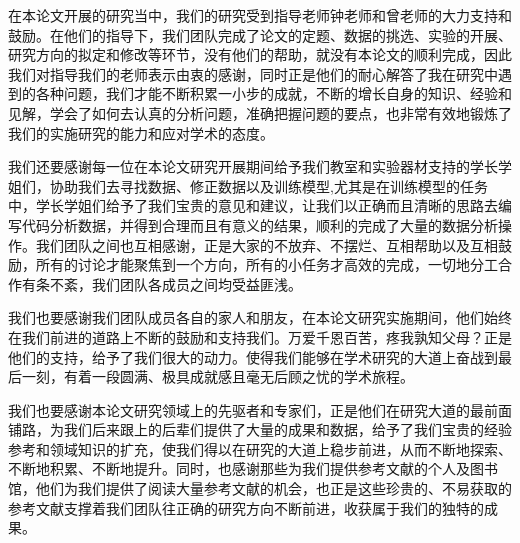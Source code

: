 
\makeacknowledgement

在本论文开展的研究当中，我们的研究受到指导老师钟老师和曾老师的大力支持和鼓励。在他们的指导下，我们团队完成了论文的定题、数据的挑选、实验的开展、研究方向的拟定和修改等环节，没有他们的帮助，就没有本论文的顺利完成，因此我们对指导我们的老师表示由衷的感谢，同时正是他们的耐心解答了我在研究中遇到的各种问题，我们才能不断积累一小步的成就，不断的增长自身的知识、经验和见解，学会了如何去认真的分析问题，准确把握问题的要点，也非常有效地锻炼了我们的实施研究的能力和应对学术的态度。

我们还要感谢每一位在本论文研究开展期间给予我们教室和实验器材支持的学长学姐们，协助我们去寻找数据、修正数据以及训练模型,尤其是在训练模型的任务中，学长学姐们给予了我们宝贵的意见和建议，让我们以正确而且清晰的思路去编写代码分析数据，并得到合理而且有意义的结果，顺利的完成了大量的数据分析操作。我们团队之间也互相感谢，正是大家的不放弃、不摆烂、互相帮助以及互相鼓励，所有的讨论才能聚焦到一个方向，所有的小任务才高效的完成，一切地分工合作有条不紊，我们团队各成员之间均受益匪浅。

我们也要感谢我们团队成员各自的家人和朋友，在本论文研究实施期间，他们始终在我们前进的道路上不断的鼓励和支持我们。万爱千恩百苦，疼我孰知父母？正是他们的支持，给予了我们很大的动力。使得我们能够在学术研究的大道上奋战到最后一刻，有着一段圆满、极具成就感且毫无后顾之忧的学术旅程。

我们也要感谢本论文研究领域上的先驱者和专家们，正是他们在研究大道的最前面铺路，为我们后来跟上的后辈们提供了大量的成果和数据，给予了我们宝贵的经验参考和领域知识的扩充，使我们得以在研究的大道上稳步前进，从而不断地探索、不断地积累、不断地提升。同时，也感谢那些为我们提供参考文献的个人及图书馆，他们为我们提供了阅读大量参考文献的机会，也正是这些珍贵的、不易获取的参考文献支撑着我们团队往正确的研究方向不断前进，收获属于我们的独特的成果。




\vspace{3em}

